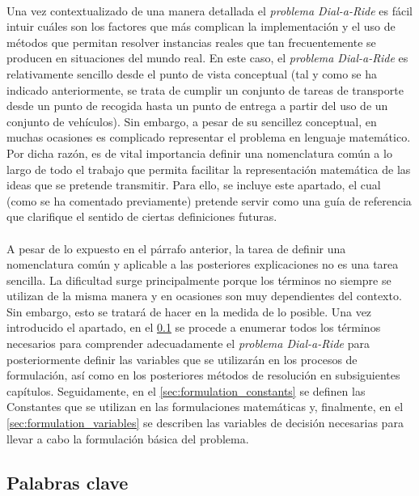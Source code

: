 \documentclass{subfiles}
\begin{document}
      \paragraph{}
      Una vez contextualizado de una manera detallada el \emph{problema Dial-a-Ride} es fácil intuir cuáles son los factores que más complican la implementación y el uso de métodos que permitan resolver instancias reales que tan frecuentemente se producen en situaciones del mundo real. En este caso, el \emph{problema Dial-a-Ride} es relativamente sencillo desde el punto de vista conceptual (tal y como se ha indicado anteriormente, se trata de cumplir un conjunto de tareas de transporte desde un punto de recogida hasta un punto de entrega a partir del uso de un conjunto de vehículos). Sin embargo, a pesar de su sencillez conceptual, en muchas ocasiones es complicado representar el problema en lenguaje matemático. Por dicha razón, es de vital importancia definir una nomenclatura común a lo largo de todo el trabajo que permita facilitar la representación matemática de las ideas que se pretende transmitir. Para ello, se incluye este apartado, el cual (como se ha comentado previamente) pretende servir como una guía de referencia que clarifique el sentido de ciertas definiciones futuras.

      \paragraph{}
      A pesar de lo expuesto en el párrafo anterior, la tarea de definir una nomenclatura común y aplicable a las posteriores explicaciones no es una tarea sencilla. La dificultad surge principalmente porque los términos no siempre se utilizan de la misma manera y en ocasiones son muy dependientes del contexto. Sin embargo, esto se tratará de hacer en la medida de lo posible. Una vez introducido el apartado, en el \cref{sec:formulation_keywords} se procede a enumerar todos los términos necesarios para comprender adecuadamente el \emph{problema Dial-a-Ride} para posteriormente definir las variables que se utilizarán en los procesos de formulación, así como en los posteriores métodos de resolución en subsiguientes capítulos. Seguidamente, en el \cref{sec:formulation_constants} se definen las Constantes que se utilizan en las formulaciones matemáticas y, finalmente, en el \cref{sec:formulation_variables} se describen las variables de decisión necesarias para llevar a cabo la formulación básica del problema.

      \subsection{Palabras clave}
      \label{sec:formulation_keywords}
\end{document}
